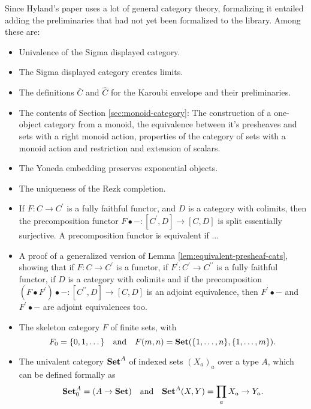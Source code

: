 Since Hyland's paper uses a lot of general category theory, formalizing it entailed adding the preliminaries that had not yet been formalized to the library. Among these are:
\begin{itemize}
  \item Univalence of the Sigma displayed category.
  \item The Sigma displayed category creates limits.
  \item The definitions $ \overline C $ and $ \hat C $ for the Karoubi envelope and their preliminaries.
  \item The contents of Section \ref{sec:monoid-category}: The construction of a one-object category from a monoid, the equivalence between it's presheaves and sets with a right monoid action, properties of the category of sets with a monoid action and restriction and extension of scalars.
  \item The Yoneda embedding preserves exponential objects.
  \item The uniqueness of the Rezk completion.
  \item If $ F : C \to C^\prime $ is a fully faithful functor, and $ D $ is a category with colimits, then the precomposition functor $ F \bullet - : [C^\prime, D] \to [C, D] $ is split essentially surjective.
  A precomposition functor is equivalent if ...
  \item A proof of a generalized version of Lemma \ref{lem:equivalent-presheaf-cats}, showing that if $ F : C \to C^\prime $ is a functor, if $ F^\prime : C^\prime \to C^{\prime \prime} $ is a fully faithful functor, if $ D $ is a category with colimits and if the precomposition $ (F \bullet F^\prime) \bullet - : [C^{\prime \prime}, D] \to [C, D] $ is an adjoint equivalence, then $ F^\prime \bullet - $ and $ F^\prime \bullet - $ are adjoint equivalences too.
  \item The skeleton category $ F $ of finite sets, with
  \[ F_0 = \{ 0, 1, \dots \} \quad \text{and} \quad F(m, n) = \mathbf{Set}(\{ 1, \dots, n \}, \{ 1, \dots, m \}). \]
  \item The univalent category $ \mathbf{Set}^A $ of indexed sets $ (X_a)_a $ over a type $ A $, which can be defined formally as
  \[ \mathbf{Set}^A_0 = (A \to \mathbf{Set}) \quad \text{and} \quad \mathbf{Set}^A(X, Y) = \prod_a X_a \to Y_a. \]
\end{itemize}

